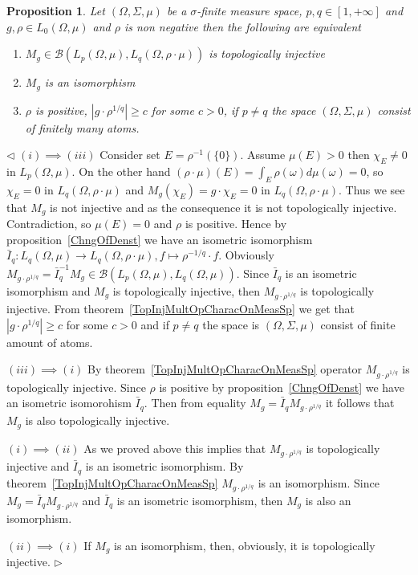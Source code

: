 \documentclass[12pt]{article}
\newtheorem{proposition}[theorem]{Proposition}
\newenvironment{proof}{\par $\triangleleft$}{$\triangleright$}
\begin{document}
\begin{proposition}\label{TopInjMultOpCharacBtwnTwoContMeasSp}
    Let $(\Omega,\Sigma,\mu)$ be a $\sigma$-finite measure space,
    $p,q\in[1,+\infty]$ and $g,\rho\in L_0(\Omega,\mu)$ and $\rho$ is non
    negative then the following are equivalent
    \begin{enumerate}[label = (\roman*)]
        \item $M_g\in\mathcal{B}(L_p(\Omega,\mu),L_q(\Omega,\rho\cdot\mu))$ is
              topologically injective

        \item $M_g$ is an isomorphism

        \item $\rho$ is  positive, $|g\cdot \rho^{1/q}|\geq c$ for some
              $c>0$, if $p\neq q$ the space $(\Omega,\Sigma,\mu)$ consist
              of finitely many atoms.
    \end{enumerate}
\end{proposition}
\begin{proof} $(i)\implies (iii)$ Consider set $E=\rho^{-1}( \{0 \})$.
    Assume $\mu(E)>0$ then $\chi_E\neq 0$ in $L_p(\Omega,\mu)$. On the other
    hand $(\rho\cdot\mu)(E)=\int_E\rho(\omega)d\mu(\omega)=0$, so $\chi_E=0$ in
    $L_q(\Omega,\rho\cdot\mu)$ and $M_g(\chi_E)=g\cdot\chi_E=0$ in
    $L_q(\Omega,\rho\cdot\mu)$. Thus we see that $M_g$ is not injective and as
    the consequence it is not topologically injective. Contradiction, so
    $\mu(E)=0$ and $\rho$ is  positive. Hence by proposition~\ref{ChngOfDenst}
    we have an isometric isomorphism
    $\bar{I}_q:L_q(\Omega,\mu)\to L_q(\Omega,\rho\cdot\mu),
        f\mapsto \rho^{-1/q}\cdot f$. Obviously
    $M_{g\cdot\rho^{1/q}}
        =\bar{I}_q^{-1} M_g\in\mathcal{B}(L_p(\Omega,\mu),L_q(\Omega,\mu))$. Since
    $\bar{I}_q$ is an isometric isomorphism and $M_g$ is topologically
    injective, then $M_{g\cdot \rho^{1/q}}$ is topologically injective. From
    theorem~\ref{TopInjMultOpCharacOnMeasSp} we get that
    $|g\cdot\rho^{1/q}|\geq c$ for some $c>0$ and if $p\neq q$ the space
    is $(\Omega,\Sigma,\mu)$ consist of finite amount of atoms.

    $(iii)\implies (i)$ By theorem~\ref{TopInjMultOpCharacOnMeasSp} operator
    $M_{g\cdot\rho^{1/q}}$ is topologically injective. Since $\rho$ is positive
    by proposition~\ref{ChngOfDenst} we have an isometric isomorohism
    $\bar{I}_q$. Then from equality $M_g=\bar{I}_q M_{g\cdot\rho^{1/q}}$ it
    follows that $M_g$ is also topologically injective.

    $(i)\implies (ii)$ As we proved above this implies that
    $M_{g\cdot\rho^{1/q}}$ is topologically injective and $\bar{I}_q$ is an
    isometric isomorphism. By theorem~\ref{TopInjMultOpCharacOnMeasSp}
    $M_{g\cdot\rho^{1/q}}$ is an isomorphism. Since
    $M_g=\bar{I}_q M_{g\cdot\rho^{1/q}}$ and $\bar{I}_q$ is an isometric
    isomorphism, then $M_g$ is also an isomorphism.

    $(ii)\implies (i)$ If $M_g$ is an isomorphism, then, obviously, it is
    topologically injective.
\end{proof}
\end{document}
